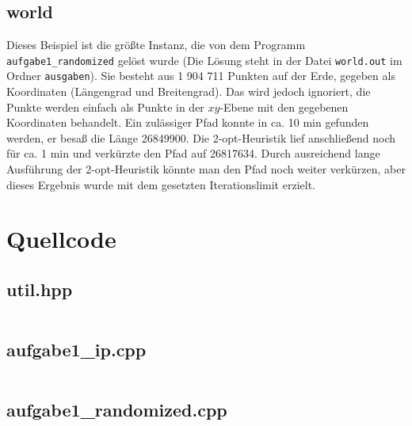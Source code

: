 \documentclass[a4paper, 10pt, ngerman]{article}
\begin{document}
\subsection{world}

Dieses Beispiel ist die größte Instanz, die von dem Programm \verb|aufgabe1_randomized| gelöst wurde (Die Lösung steht in der Datei \verb|world.out| im Ordner \verb|ausgaben|). Sie besteht aus 1 904 711 Punkten auf der Erde, gegeben als Koordinaten (Längengrad und Breitengrad). Das wird jedoch ignoriert, die Punkte werden einfach als Punkte in der $xy$-Ebene mit den gegebenen Koordinaten behandelt. Ein zulässiger Pfad konnte in ca. 10 min gefunden werden, er besaß die Länge 26849900. Die 2-opt-Heuristik lief anschließend noch für ca. 1 min und verkürzte den Pfad auf 26817634. Durch ausreichend lange Ausführung der 2-opt-Heuristik könnte man den Pfad noch weiter verkürzen, aber dieses Ergebnis wurde mit dem gesetzten Iterationslimit erzielt.

\section{Quellcode}

\subsection{util.hpp}

\inputminted{c++}{aufgabe1/util.hpp}

\subsection{aufgabe1\_ip.cpp}

\inputminted{c++}{aufgabe1/aufgabe1_ip.cpp}

\subsection{aufgabe1\_randomized.cpp}

\inputminted{c++}{aufgabe1/aufgabe1_randomized.cpp}
\end{document}
